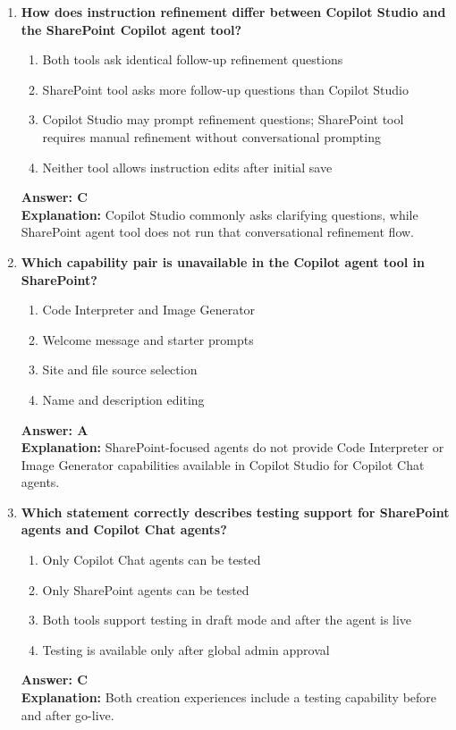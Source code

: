 \documentclass[10pt]{article}
\begin{document}
\begin{enumerate}[leftmargin=*]
\item \textbf{How does instruction refinement differ between Copilot Studio and the SharePoint Copilot agent tool?}
\begin{enumerate}[label=\Alph*.]
  \item Both tools ask identical follow-up refinement questions
  \item SharePoint tool asks more follow-up questions than Copilot Studio
  \item Copilot Studio may prompt refinement questions; SharePoint tool requires manual refinement without conversational prompting
  \item Neither tool allows instruction edits after initial save
\end{enumerate}
\textbf{Answer: C}\\
\textbf{Explanation:} Copilot Studio commonly asks clarifying questions, while SharePoint agent tool does not run that conversational refinement flow.

\item \textbf{Which capability pair is unavailable in the Copilot agent tool in SharePoint?}
\begin{enumerate}[label=\Alph*.]
  \item Code Interpreter and Image Generator
  \item Welcome message and starter prompts
  \item Site and file source selection
  \item Name and description editing
\end{enumerate}
\textbf{Answer: A}\\
\textbf{Explanation:} SharePoint-focused agents do not provide Code Interpreter or Image Generator capabilities available in Copilot Studio for Copilot Chat agents.

\item \textbf{Which statement correctly describes testing support for SharePoint agents and Copilot Chat agents?}
\begin{enumerate}[label=\Alph*.]
  \item Only Copilot Chat agents can be tested
  \item Only SharePoint agents can be tested
  \item Both tools support testing in draft mode and after the agent is live
  \item Testing is available only after global admin approval
\end{enumerate}
\textbf{Answer: C}\\
\textbf{Explanation:} Both creation experiences include a testing capability before and after go-live.


\end{enumerate}
\end{document}
